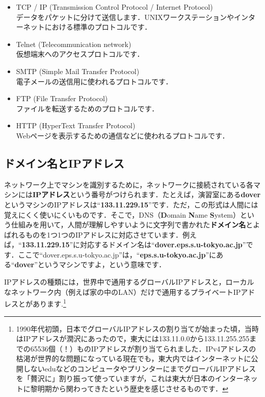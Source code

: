 \documentclass{jarticle}
\begin{document}
\begin{itemize}
\item TCP / IP (Transmission Control Protocol / Internet Protocol)\\
データをパケットに分けて送信します．UNIXワークステーションやインターネットにおける標準のプロトコルです．
\item Telnet (Telecommunication network)\\
仮想端末へのアクセスプロトコルです．
\item SMTP (Simple Mail Transfer Protocol)\\
電子メールの送信用に使われるプロトコルです．
\item FTP (File Transfer Protocol)\\
ファイルを転送するためのプロトコルです．
\item HTTP (HyperText Transfer Protocol)\\
Webページを表示するための通信などに使われるプロトコルです．
\end{itemize}

\subsection{ドメイン名とIPアドレス}
ネットワーク上でマシンを識別するために，ネットワークに接続されている各マシンには{\bf IPアドレス}という番号がつけられます．たとえば，演習室にある{\bf dover}というマシンのIPアドレスは“{\bf 133.11.229.15}”です．ただ，この形式は人間には覚えにくく使いにくいものです．そこで，DNS（\textbf{D}omain \textbf{N}ame \textbf{S}ystem）という仕組みを用いて，人間が理解しやすいように文字列で書かれた{\bf ドメイン名}とよばれるものを1つ1つのIPアドレスに対応させています．例えば，“{\bf 133.11.229.15}”に対応するドメイン名は“{\bf dover.eps.s.u-tokyo.ac.jp}”です．ここで“dover.eps.s.u-tokyo.ac.jp”は，“{\bf eps.s.u-tokyo.ac.jp}”にある“{\bf dover}”というマシンですよ，という意味です．

IPアドレスの種類には，世界中で通用するグローバルIPアドレスと，ローカルなネットワーク内（例えば家の中のLAN）だけで通用するプライベートIPアドレスとがあります.\footnote{1990年代初頭，日本でグローバルIPアドレスの割り当てが始まった頃，当時はIPアドレスが潤沢にあったので，東大には133.11.0.0から133.11.255.255までの65536個（！）ものIPアドレスが割り当てられました．IPv4アドレスの枯渇が世界的な問題になっている現在でも，東大内ではインターネットに公開しないeduなどのコンピュータやプリンターにまでグローバルIPアドレスを「贅沢に」割り振って使っていますが，これは東大が日本のインターネットに黎明期から関わってきたという歴史を感じさせるものです．}
\end{document}
